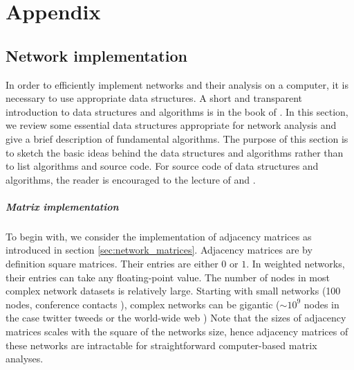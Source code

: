 %
%
%
%
%
%
%

\chapter{Appendix}

\section{Network implementation}\label{sec:implementation}
In order to efficiently implement networks and their analysis on a computer, it is necessary to use appropriate data structures.
A short and transparent introduction to data structures and algorithms is in the book of \citeauthor{algorithm_design} \citep{algorithm_design}.
In this section, we review some essential data structures appropriate for network analysis and give a brief description of fundamental algorithms.
The purpose of this section is to sketch the basic ideas behind the data structures and algorithms rather than to list algorithms and source code.
For source code of data structures and algorithms, the reader is encouraged to the lecture of \citep{algorithm_design} and \citep{Merali:2010ih}.

\paragraph{Matrix implementation\color{Cayenne}{.}}
To begin with, we consider the implementation of adjacency matrices as introduced in section \ref{sec:network_matrices}.
Adjacency matrices are by definition square matrices.
Their entries are either $0$ or $1$.
In weighted networks, their entries can take any floating-point value.
The number of nodes in most complex network datasets is relatively large. 
Starting with small networks (100 nodes, conference contacts \citep{isella2011}), complex networks can be gigantic ($\sim 10^9$ nodes in the case twitter tweeds \citep{Yang:2011} or the world-wide web \citep{Albert:1999uu,Broder:2000ej})
Note that the sizes of adjacency matrices scales with the square of the networks size, hence adjacency matrices of these networks are intractable for straightforward computer-based matrix analyses.

